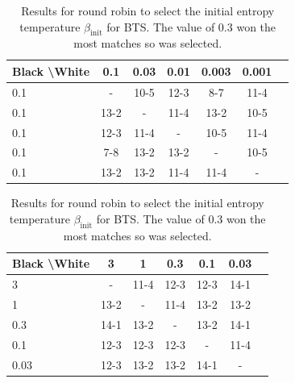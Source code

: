 \documentclass{article}
\theoremstyle{plain}
\begin{document}
\begin{appendices}
            
            \begin{table}[]
            \centering
                \begin{tabular}{l|cccccc}
                    \textbf{Black \textbackslash White}     & 0.1  & 0.03   & 0.01   & 0.003    & 0.001    \\ 
                    \hline
                                            0.1            & - & 10-5 & 12-3 & 8-7 & 11-4  		\\
                                            0.1            & 13-2 & - & 11-4 & 13-2  & 10-5   		\\
                                            0.1            & 12-3 & 11-4 & - & 10-5 & 11-4  		\\
                                            0.1            & 7-8 & 13-2 & 13-2 & - & 10-5  		\\
                                            0.1            & 13-2 & 13-2 & 11-4 & 11-4 &  - 		\\
                \end{tabular}
                \caption{Results for round robin to select the initial entropy temperature $\beta_{\text{init}}$ for BTS. The value of 0.3 won the most matches so was selected. \label{tab:w070}}
            \end{table}
            
            \begin{table}[]
            \centering
                \begin{tabular}{l|cccccc}
                    \textbf{Black \textbackslash White}     & 3  & 1   & 0.3   & 0.1    & 0.03    \\ 
                    \hline
                                            3            & - & 11-4 & 12-3 & 12-3 & 14-1  		\\
                                            1            & 13-2 & - & 11-4 & 13-2 & 13-2  		\\
                                            0.3            & 14-1 & 13-2 & - & 13-2 & 14-1  		\\
                                            0.1            & 12-3 & 12-3 & 12-3 & - & 11-4  		\\
                                            0.03            & 12-3 & 13-2 & 13-2 & 14-1 &  - 		\\
                \end{tabular}
                \caption{Results for round robin to select the initial entropy temperature $\beta_{\text{init}}$ for BTS. The value of 0.3 won the most matches so was selected. \label{tab:x070}}
            \end{table}
            

\end{appendices}
\end{document}
